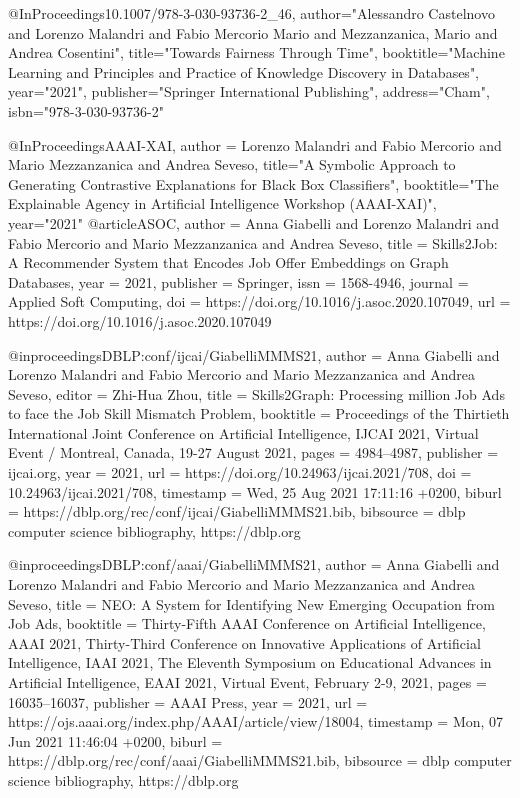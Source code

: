 {@InProceedings{10.1007/978-3-030-93736-2_46,
author="Alessandro Castelnovo and Lorenzo Malandri and Fabio Mercorio Mario and Mezzanzanica, Mario and Andrea Cosentini",
title="Towards Fairness Through Time",
booktitle="Machine Learning and Principles and Practice of Knowledge Discovery in Databases",
year="2021",
publisher="Springer International Publishing",
address="Cham",
isbn="978-3-030-93736-2"
}

@InProceedings{AAAI-XAI,
author = {Lorenzo Malandri and Fabio Mercorio and Mario Mezzanzanica and Andrea Seveso},
title="A Symbolic Approach to Generating Contrastive Explanations for Black Box Classifiers",
booktitle="The Explainable Agency in Artificial Intelligence Workshop (AAAI-XAI)",
year="2021"
}
@article{ASOC,
	author = {Anna Giabelli and Lorenzo Malandri and Fabio Mercorio and Mario Mezzanzanica and Andrea Seveso},
	title = {Skills2Job: A Recommender System that Encodes Job Offer Embeddings on Graph Databases},
	year = {2021},
	publisher = {Springer},
	issn = {1568-4946},
	journal = {Applied Soft Computing},
    doi = {https://doi.org/10.1016/j.asoc.2020.107049},
    url = {https://doi.org/10.1016/j.asoc.2020.107049}
}

@inproceedings{DBLP:conf/ijcai/GiabelliMMMS21,
  author    = {Anna Giabelli and
               Lorenzo Malandri and
               Fabio Mercorio and
               Mario Mezzanzanica and
               Andrea Seveso},
  editor    = {Zhi{-}Hua Zhou},
  title     = {Skills2Graph: Processing million Job Ads to face the Job Skill Mismatch
               Problem},
  booktitle = {Proceedings of the Thirtieth International Joint Conference on Artificial
               Intelligence, {IJCAI} 2021, Virtual Event / Montreal, Canada, 19-27
               August 2021},
  pages     = {4984--4987},
  publisher = {ijcai.org},
  year      = {2021},
  url       = {https://doi.org/10.24963/ijcai.2021/708},
  doi       = {10.24963/ijcai.2021/708},
  timestamp = {Wed, 25 Aug 2021 17:11:16 +0200},
  biburl    = {https://dblp.org/rec/conf/ijcai/GiabelliMMMS21.bib},
  bibsource = {dblp computer science bibliography, https://dblp.org}
}

@inproceedings{DBLP:conf/aaai/GiabelliMMMS21,
  author    = {Anna Giabelli and
               Lorenzo Malandri and
               Fabio Mercorio and
               Mario Mezzanzanica and
               Andrea Seveso},
  title     = { {NEO}: {A} System for Identifying New Emerging Occupation from Job
               Ads},
  booktitle = {Thirty-Fifth {AAAI} Conference on Artificial Intelligence, {AAAI}
               2021, Thirty-Third Conference on Innovative Applications of Artificial
               Intelligence, {IAAI} 2021, The Eleventh Symposium on Educational Advances
               in Artificial Intelligence, {EAAI} 2021, Virtual Event, February 2-9,
               2021},
  pages     = {16035--16037},
  publisher = {AAAI Press},
  year      = {2021},
  url       = {https://ojs.aaai.org/index.php/AAAI/article/view/18004},
  timestamp = {Mon, 07 Jun 2021 11:46:04 +0200},
  biburl    = {https://dblp.org/rec/conf/aaai/GiabelliMMMS21.bib},
  bibsource = {dblp computer science bibliography, https://dblp.org}
}

}
